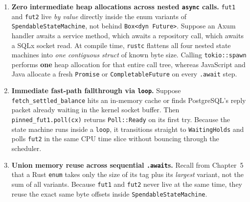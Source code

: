 \begin{enumerate}
  \item \textbf{Zero intermediate heap allocations across nested \texttt{async} calls.} \texttt{fut1} and \texttt{fut2} live \emph{by value} directly inside the enum variants of \texttt{SpendableStateMachine}, not behind \texttt{Box<dyn Future>}. Suppose an Axum handler awaits a service method, which awaits a repository call, which awaits a SQLx socket read. At compile time, \texttt{rustc} flattens all four nested state machines into \emph{one contiguous struct} of known byte size. Calling \texttt{tokio::spawn} performs \textbf{one} heap allocation for that entire call tree, whereas JavaScript and Java allocate a fresh \texttt{Promise} or \texttt{CompletableFuture} on every \texttt{.await} step.
  \item \textbf{Immediate fast-path fallthrough via \texttt{loop}.} Suppose \texttt{fetch\_settled\_balance} hits an in-memory cache or finds PostgreSQL's reply packet already waiting in the kernel socket buffer. Then \texttt{pinned\_fut1.poll(cx)} returns \texttt{Poll::Ready} on its first try. Because the state machine runs inside a \texttt{loop}, it transitions straight to \texttt{WaitingHolds} and polls \texttt{fut2} in the same CPU time slice without bouncing through the scheduler.
  \item \textbf{Union memory reuse across sequential \texttt{.await}s.} Recall from Chapter~5 that a Rust \texttt{enum} takes only the size of its tag plus its \emph{largest} variant, not the sum of all variants. Because \texttt{fut1} and \texttt{fut2} never live at the same time, they reuse the exact same byte offsets inside \texttt{SpendableStateMachine}.
\end{enumerate}

